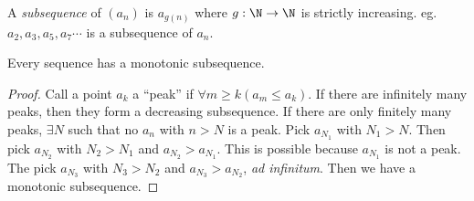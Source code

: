 \documentclass[a4paper]{article}
\begin{document}
  \begin{defi}[Subsequence]
    A \emph{subsequence} of $(a_n)$ is $a_{g(n)}$ where $g: \N\to\N$ is strictly increasing. eg. $a_2, a_3, a_5, a_7\cdots$ is a subsequence of $a_n$.
  \end{defi}

  \begin{thm}
    Every sequence has a monotonic subsequence.
  \end{thm}

  \begin{proof}
    Call a point $a_k$ a ``peak'' if $ \forall m \geq k(a_m \leq a_k)$. If there are infinitely many peaks, then they form a decreasing subsequence. If there are only finitely many peaks, $\exists N$ such that no $a_n$ with $n > N$ is a peak. Pick $a_{N_1}$ with $N_1 > N$. Then pick $a_{N_2}$ with $N_2 > N_1$ and $a_{N_2} > a_{N_1}$. This is possible because $a_{N_1}$ is not a peak. The pick $a_{N_3}$ with $N_3 > N_2$ and $a_{N_3}> a_{N_2}$, \emph{ad infinitum}. Then we have a monotonic subsequence.
  \end{proof}
\end{document}
